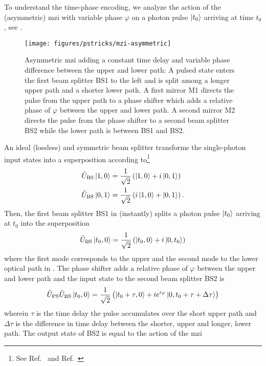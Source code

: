To understand the time-phase encoding, we analyze the action of the (asymmetric) \gls{mzi} with variable phase $\varphi$ on a photon pulse $\ket{t_0}$ arriving at time $t_0$, see .
\begin{figure}[htb]
    \centering
    \texttt{[image: figures/pstricks/mzi-asymmetric]}
     \caption{Asymmetric \gls{mzi} adding a constant time delay and variable phase difference between the upper and lower path: A pulsed state enters the first beam splitter BS1 to the left and is split among a longer upper path and a shorter lower path. A first mirror M1 directs the pulse from the upper path to a phase shifter which adds a relative phase of $\varphi$ between the upper and lower path. A second mirror M2 directs the pulse from the phase shifter to a second beam splitter BS2 while the lower path is between BS1 and BS2.}\label{fig:mzi_asymmetric}
\end{figure}
An ideal (lossless) and symmetric beam splitter transforms the single-photon input states into a superposition according to\footnote{See Ref.~\cite[p.~137]{Haroche2006} and Ref.~\cite[p.~143]{Gerry2005}}
\begin{align}
	\hat{U}_\text{BS}
	\ket{1,0}
	&=
	\frac{1}{\sqrt{2}}
	\left(\ket{1,0}+i\ket{0,1}\right)
	\\
	\hat{U}_\text{BS}
	\ket{0,1}
	&=
	\frac{1}{\sqrt{2}}
	\left(i\ket{1,0}+\ket{0,1}\right)
	.
\end{align}
Then, the first beam splitter BS1 in  (instantly) splits a photon pulse $\ket{t_0}$ arriving at $t_0$ into the superposition
\begin{equation}
	\hat{U}_\text{BS}
	\ket{t_0,0}
	=
	\frac{1}{\sqrt{2}}
	\left(\ket{t_0,0}+i\ket{0,t_0}\right)
\end{equation}
where the first mode corresponds to the upper and the second mode to the lower optical path in .
The phase shifter adds a relative phase of $\varphi$ between the upper and lower path and the input state to the second beam splitter BS2 is
\begin{equation}
	\hat{U}_\text{PS}
	\hat{U}_\text{BS}
	\ket{t_0,0}
	=
	\frac{1}{\sqrt{2}}
	\left(
		\ket{t_0+\tau,0}
		+
		ie^{i\varphi}
		\ket{0,t_0+\tau+\Delta\tau}
	\right)
\end{equation}
wherein $\tau$ is the time delay the pulse accumulates over the short upper path and $\Delta\tau$ is the difference in time delay between the shorter, upper and longer, lower path.
The output state of BS2 is equal to the action of the \gls{mzi}
